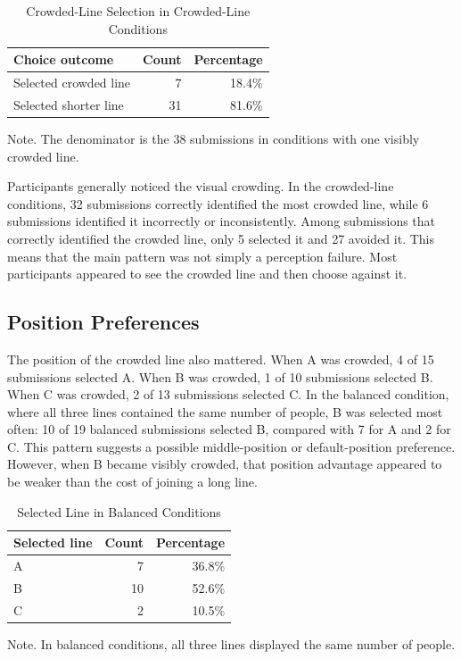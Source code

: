 \documentclass[stu,12pt,floatsintext]{apa7}
\begin{document}
\begin{table}
\caption{Crowded-Line Selection in Crowded-Line Conditions}
\centering
\begin{tabular}{lrr}
\hline
Choice outcome & Count & Percentage \\
\hline
Selected crowded line & 7 & 18.4\% \\
Selected shorter line & 31 & 81.6\% \\
\hline
\end{tabular}
\smallskip
\noindent Note. The denominator is the 38 submissions in conditions with one visibly crowded line.
\label{tab:crowded_choice}
\end{table}

Participants generally noticed the visual crowding. In the crowded-line conditions, 32 submissions correctly identified the most crowded line, while 6 submissions identified it incorrectly or inconsistently. Among submissions that correctly identified the crowded line, only 5 selected it and 27 avoided it. This means that the main pattern was not simply a perception failure. Most participants appeared to see the crowded line and then choose against it.

\subsection{Position Preferences}

The position of the crowded line also mattered. When A was crowded, 4 of 15 submissions selected A. When B was crowded, 1 of 10 submissions selected B. When C was crowded, 2 of 13 submissions selected C. In the balanced condition, where all three lines contained the same number of people, B was selected most often: 10 of 19 balanced submissions selected B, compared with 7 for A and 2 for C. This pattern suggests a possible middle-position or default-position preference. However, when B became visibly crowded, that position advantage appeared to be weaker than the cost of joining a long line.

\begin{table}
\caption{Selected Line in Balanced Conditions}
\centering
\begin{tabular}{lrr}
\hline
Selected line & Count & Percentage \\
\hline
A & 7 & 36.8\% \\
B & 10 & 52.6\% \\
C & 2 & 10.5\% \\
\hline
\end{tabular}
\smallskip
\noindent Note. In balanced conditions, all three lines displayed the same number of people.
\label{tab:balanced_choices}
\end{table}
\end{document}
